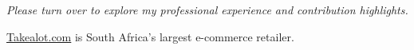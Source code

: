 \documentclass[10pt,a4paper,final]{columncv}
\begin{document}



\begin{center}
  {\textit{\color{subheading}Please turn over to explore my professional experience and contribution highlights.}}
\end{center}

\pagebreak

\noindent \href{http://www.takealot.com/}{Takealot.com} is South Africa's largest e-commerce retailer.
\end{document}
